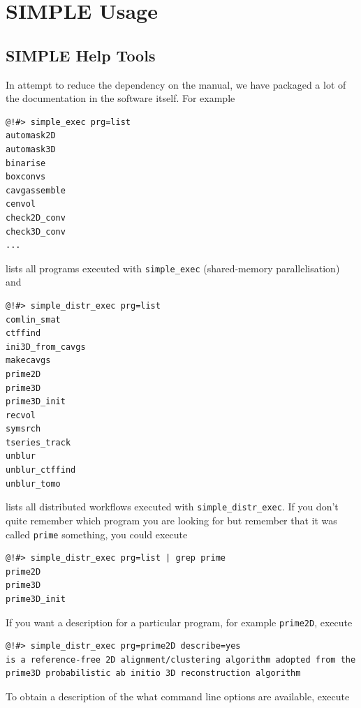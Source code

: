 \documentclass[a4paper,11pt]{article}
\newcommand{\prgname}[1]{\textcolor{NavyBlue}{\texttt{#1}}}
\begin{document}
\section{SIMPLE Usage}

\subsection{SIMPLE Help Tools}
In attempt to reduce the dependency on the manual, we have packaged a lot of the documentation in the software itself. For example
\begin{verbatim}
@!#> simple_exec prg=list
automask2D
automask3D
binarise
boxconvs
cavgassemble
cenvol
check2D_conv
check3D_conv
...
\end{verbatim}
lists all programs executed with \texttt{simple\_exec} (shared-memory parallelisation) and
\begin{verbatim}
@!#> simple_distr_exec prg=list
comlin_smat
ctffind
ini3D_from_cavgs
makecavgs
prime2D
prime3D
prime3D_init
recvol
symsrch
tseries_track
unblur
unblur_ctffind
unblur_tomo
\end{verbatim}
lists all distributed workflows executed with \texttt{simple\_distr\_exec}. If you don't quite remember which program you are looking for but remember that it was called \texttt{prime} something, you could execute
\begin{verbatim}
@!#> simple_distr_exec prg=list | grep prime
prime2D
prime3D
prime3D_init
\end{verbatim}
If you want a description for a particular program, for example \prgname{prime2D}, execute
\begin{verbatim}
@!#> simple_distr_exec prg=prime2D describe=yes
is a reference-free 2D alignment/clustering algorithm adopted from the 
prime3D probabilistic ab initio 3D reconstruction algorithm
\end{verbatim}
To obtain a description of the what command line options are available, execute
\end{document}
